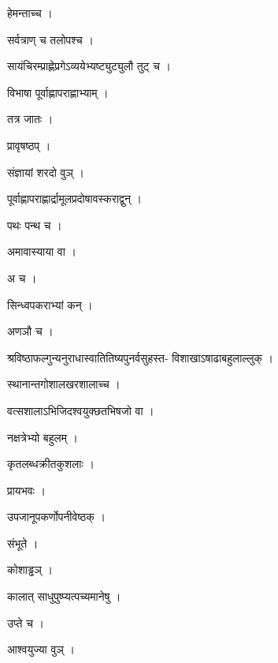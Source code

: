 \documentclass[10pt, openany]{book}
\begin{document}
\noindent हेमन्ताच्च ।

\noindent सर्वत्राण् च तलोपश्च ।

\noindent सायंचिरम्प्राह्णेप्रगेऽव्ययेभ्यष्ट्युट्युलौ तुट् च ।

\noindent विभाषा पूर्वाह्णापराह्णाभ्याम् ।

\noindent तत्र जातः ।

\noindent प्रावृषष्ठप् ।

\noindent संज्ञायां शरदो वुञ् ।

\noindent पूर्वाह्णापराह्णार्द्रामूलप्रदोषावस्कराद्वुन् ।

\noindent पथः पन्थ च ।

\noindent अमावास्याया वा ।

\noindent अ च ।

\noindent सिन्ध्वपकराभ्यां कन् ।

\noindent अणञौ च ।

\noindent श्रविष्ठाफल्गुन्यनुराधास्वातितिष्यपुनर्वसुहस्त- विशाखाऽषाढाबहुलाल्लुक् ।

\noindent स्थानान्तगोशालखरशालाच्च ।

\noindent वत्सशालाऽभिजिदश्वयुक्छतभिषजो वा ।

\noindent नक्षत्रेभ्यो बहुलम् ।

\noindent कृतलब्धक्रीतकुशलाः ।

\noindent प्रायभवः ।

\noindent उपजानूपकर्णोपनीवेष्ठक् ।

\noindent संभूते ।

\noindent कोशाड्ढञ् ।

\noindent कालात् साधुपुष्प्यत्पच्यमानेषु ।

\noindent उप्ते च ।

\noindent आश्वयुज्या वुञ् ।
\end{document}
